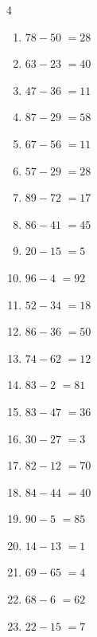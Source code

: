 \begin{multicols}{4}
\begin{enumerate}
  \item $78-50$
        $=28$

  \item $63-23$
        $=40$

  \item $47-36$
        $=11$

  \item $87-29$
        $=58$

  \item $67-56$
        $=11$

  \item $57-29$
        $=28$

  \item $89-72$
        $=17$

  \item $86-41$
        $=45$

  \item $20-15$
        $=5$

  \item $96-4$
        $=92$

  \item $52-34$
        $=18$

  \item $86-36$
        $=50$

  \item $74-62$
        $=12$

  \item $83-2$
        $=81$

  \item $83-47$
        $=36$

  \item $30-27$
        $=3$

  \item $82-12$
        $=70$

  \item $84-44$
        $=40$

\columnbreak %

  \item $90-5$
        $=85$

  \item $14-13$
        $=1$

  \item $69-65$
        $=4$

  \item $68-6$
        $=62$

  \item $22-15$
        $=7$


\end{enumerate}
\end{multicols}
